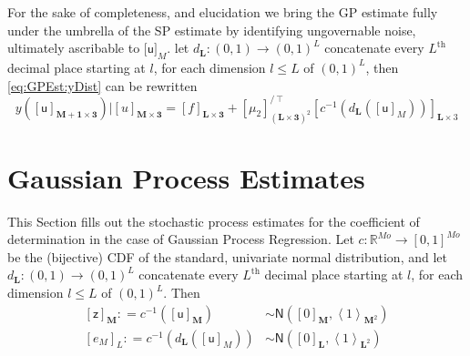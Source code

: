 \documentclass[preprint,12pt]{elsarticle}
\newcommand*{\M}[1]{\ensuremath{#1}\xspace}
\newcommand*{\x}{\times}
\newcommand*{\mi}[1]{\mathbf{#1}}
\newcommand*{\st}[1]{\mathbb{#1}}
\newcommand*{\rv}[1]{\mathsf{#1}}
\newcommand*{\te}[2][]{\left\lbrack{#2}\right\rbrack_{#1}}
\newcommand*{\tte}[2][]{\lbrack{#2}\rbrack_{#1}}
\newcommand*{\diag}[2][]{\left\langle{#2}\right\rangle_{#1}}
\newcommand*{\deq}{\M{\mathrel{\mathop:}=}}
\newcommand*{\gauss}[2]{\mathsf{N}\!\left({#1,#2}\right)}
\begin{document}
        For the sake of completeness, and elucidation we bring the GP estimate fully under the umbrella of the SP estimate by identifying ungovernable noise, ultimately ascribable to $\tte[M]{\rv{u}}$.
        let $d_{\mi{L}}\colon (0,1) \to (0,1)^{L}$ concatenate every $L^{\mathrm{th}}$ decimal place starting at $l$, for each dimension $l\leq L$ of $(0,1)^{L}$, then \cref{eq:GPEst:yDist} can be rewritten
        \begin{equation}\label{eq:GPEst:yReveal}
            y(\te[\mi{M+1\x 3}]{\rv{u}}) \big\vert \te[\mi{M\x 3}]{u} = \te[\mi{L\x 3}]{f} + \te[(\mi{L\x 3})^{2}]{\mu_{2}}^{/\intercal} \te[\mi{L}\x 3]{c^{-1}\!\left(d_{\mi{L}}\left(\te[M]{\rv{u}}\right)\right)}
        \end{equation}


\section{Gaussian Process Estimates}\label{sec:GPEstimates}
    This Section fills out the stochastic process estimates for the coefficient of determination in the case of Gaussian Process Regression. 
    Let $c\colon \st{R}^{Mo} \to [0,1]^{Mo}$ be the (bijective) CDF of the standard, univariate normal distribution, and let $d_{\mi{L}}\colon (0,1) \to (0,1)^{L}$ concatenate every $L^{\mathrm{th}}$ decimal place starting at $l$, for each dimension $l\leq L$ of $(0,1)^{L}$. Then
    \begin{equation*}
        \begin{aligned}
            \te[\mi{M}]{\rv{z}} \deq c^{-1}\!\left(\te[\mi{M}]{\rv{u}}\right) &\sim \gauss{\te[\mi{M}]{0}}{\diag[\mi{M}^2]{1}} \\
            \te[L]{e_{M}} \deq c^{-1}\!\left(d_{\mi{L}}\left(\te[M]{\rv{u}}\right)\right) &\sim \gauss{\te[\mi{L}]{0}}{\diag[\mi{L}^2]{1}}
        \end{aligned}
    \end{equation*}
\end{document}
